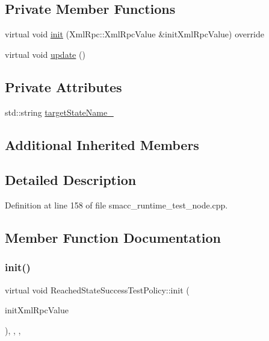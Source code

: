 \subsection*{Private Member Functions}
\begin{DoxyCompactItemize}
\item 
virtual void \hyperlink{classReachedStateSuccessTestPolicy_a2a3e598a103fcad64d7a6546c56a0fdd}{init} (Xml\+Rpc\+::\+Xml\+Rpc\+Value \&init\+Xml\+Rpc\+Value) override
\item 
virtual void \hyperlink{classReachedStateSuccessTestPolicy_a34696eeabca13524db58dc8c72ffac6c}{update} ()
\end{DoxyCompactItemize}
\subsection*{Private Attributes}
\begin{DoxyCompactItemize}
\item 
std\+::string \hyperlink{classReachedStateSuccessTestPolicy_a2dc3e3fae4d136b61ca9499eebb06ba2}{target\+State\+Name\+\_\+}
\end{DoxyCompactItemize}
\subsection*{Additional Inherited Members}


\subsection{Detailed Description}


Definition at line 158 of file smacc\+\_\+runtime\+\_\+test\+\_\+node.\+cpp.



\subsection{Member Function Documentation}
\mbox{\label{classReachedStateSuccessTestPolicy_a2a3e598a103fcad64d7a6546c56a0fdd}} 
\subsubsection{\texorpdfstring{init()}{init()}}
{\footnotesize\ttfamily virtual void Reached\+State\+Success\+Test\+Policy\+::init (\begin{DoxyParamCaption}\item[{Xml\+Rpc\+::\+Xml\+Rpc\+Value \&}]{init\+Xml\+Rpc\+Value }\end{DoxyParamCaption})\hspace{0.3cm}{\ttfamily [inline]}, {\ttfamily [override]}, {\ttfamily [private]}, {\ttfamily [virtual]}}



